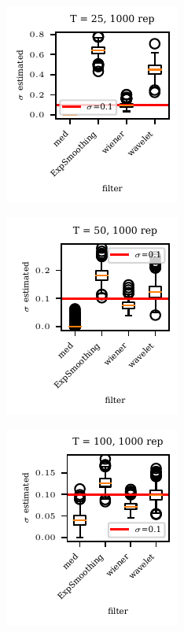 \documentclass[oneside]{article}
\theoremstyle{plain}%
\theoremstyle{definition}
\begin{document}
\begin{figure}
  \centering
    \begin{subfigure}{0.24\textwidth}
        \includegraphics{plots/std estimation/std_estimation_boxplot_25.pdf}
    \end{subfigure}
    \begin{subfigure}{0.24\textwidth}
        \includegraphics{plots/std estimation/std_estimation_boxplot_50.pdf}
    \end{subfigure}
    \begin{subfigure}{0.24\textwidth}
        \includegraphics{plots/std estimation/std_estimation_boxplot_100.pdf}
    \end{subfigure}

\end{figure}
\end{document}
